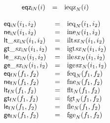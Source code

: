 $$
\begin{array}[t]{@{}lcl@{}l@{}}
{\mathsf{eqz}}{{}_{{\mathsf{i}}{N}}(i)} & = & {{\mathrm{ieqz}}}_{N}(i) \\
\end{array}
$$

$$
\begin{array}[t]{@{}lcl@{}l@{}}
{\mathsf{eq}}{{}_{{\mathsf{i}}{N}}(i_1, i_2)} & = & {{\mathrm{ieq}}}_{N}(i_1, i_2) \\
{\mathsf{ne}}{{}_{{\mathsf{i}}{N}}(i_1, i_2)} & = & {{\mathrm{ine}}}_{N}(i_1, i_2) \\
{{\mathsf{lt}}{\mathsf{\_}}{{\mathit{sx}}}}{{}_{{\mathsf{i}}{N}}(i_1, i_2)} & = & {{\mathrm{ilt}}}{{\mathit{sx}}}{{}_{N}(i_1, i_2)} \\
{{\mathsf{gt}}{\mathsf{\_}}{{\mathit{sx}}}}{{}_{{\mathsf{i}}{N}}(i_1, i_2)} & = & {{\mathrm{igt}}}{{\mathit{sx}}}{{}_{N}(i_1, i_2)} \\
{{\mathsf{le}}{\mathsf{\_}}{{\mathit{sx}}}}{{}_{{\mathsf{i}}{N}}(i_1, i_2)} & = & {{\mathrm{ile}}}{{\mathit{sx}}}{{}_{N}(i_1, i_2)} \\
{{\mathsf{ge}}{\mathsf{\_}}{{\mathit{sx}}}}{{}_{{\mathsf{i}}{N}}(i_1, i_2)} & = & {{\mathrm{ige}}}{{\mathit{sx}}}{{}_{N}(i_1, i_2)} \\
{\mathsf{eq}}{{}_{{\mathsf{f}}{N}}(f_1, f_2)} & = & {{\mathrm{feq}}}_{N}(f_1, f_2) \\
{\mathsf{ne}}{{}_{{\mathsf{f}}{N}}(f_1, f_2)} & = & {{\mathrm{fne}}}_{N}(f_1, f_2) \\
{\mathsf{lt}}{{}_{{\mathsf{f}}{N}}(f_1, f_2)} & = & {{\mathrm{flt}}}_{N}(f_1, f_2) \\
{\mathsf{gt}}{{}_{{\mathsf{f}}{N}}(f_1, f_2)} & = & {{\mathrm{fgt}}}_{N}(f_1, f_2) \\
{\mathsf{le}}{{}_{{\mathsf{f}}{N}}(f_1, f_2)} & = & {{\mathrm{fle}}}_{N}(f_1, f_2) \\
{\mathsf{ge}}{{}_{{\mathsf{f}}{N}}(f_1, f_2)} & = & {{\mathrm{fge}}}_{N}(f_1, f_2) \\
\end{array}
$$

